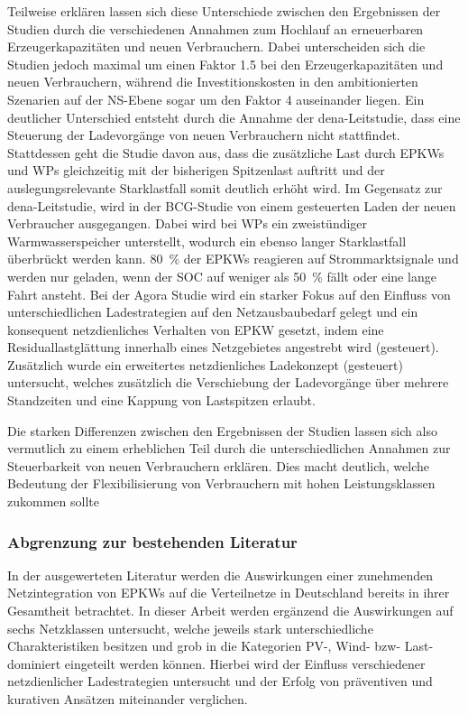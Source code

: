 Teilweise erklären lassen sich diese Unterschiede zwischen den Ergebnissen der Studien durch die verschiedenen Annahmen zum Hochlauf an erneuerbaren Erzeugerkapazitäten und neuen Verbrauchern.
Dabei unterscheiden sich die Studien jedoch maximal um einen Faktor \num{1.5} bei den Erzeugerkapazitäten und neuen Verbrauchern, während die Investitionskosten in den ambitionierten Szenarien auf der \gls{NS}-Ebene sogar um den Faktor \num{4} auseinander liegen.
Ein deutlicher Unterschied entsteht durch die Annahme der dena-Leitstudie, dass eine Steuerung der Ladevorgänge von neuen Verbrauchern nicht stattfindet.
Stattdessen geht die Studie davon aus, dass die zusätzliche Last durch \glspl{EPKW} und \glspl{WP} gleichzeitig mit der bisherigen Spitzenlast auftritt und der auslegungsrelevante Starklastfall somit deutlich erhöht wird.
Im Gegensatz zur dena-Leitstudie, wird in der BCG-Studie von einem gesteuerten Laden der neuen Verbraucher ausgegangen.
Dabei wird bei \glspl{WP} ein zweistündiger Warmwasserspeicher unterstellt, wodurch ein ebenso langer Starklastfall überbrückt werden kann.
\SI{80}{\percent} der \glspl{EPKW} reagieren auf Strommarktsignale und werden nur geladen, wenn der \gls{SOC} auf weniger als \SI{50}{\percent} fällt oder eine lange Fahrt ansteht.
Bei der Agora Studie wird ein starker Fokus auf den Einfluss von unterschiedlichen Ladestrategien auf den Netzausbaubedarf gelegt und ein konsequent netzdienliches Verhalten von \gls{EPKW} gesetzt, indem eine Residuallastglättung innerhalb eines Netzgebietes angestrebt wird (gesteuert).
Zusätzlich wurde ein erweitertes netzdienliches Ladekonzept (gesteuert\Plus) untersucht, welches zusätzlich die Verschiebung der Ladevorgänge über mehrere Standzeiten und eine Kappung von Lastspitzen erlaubt.\medskip

Die starken Differenzen zwischen den Ergebnissen der Studien lassen sich also vermutlich zu einem erheblichen Teil durch die unterschiedlichen Annahmen zur Steuerbarkeit von neuen Verbrauchern erklären.
Dies macht deutlich, welche Bedeutung der Flexibilisierung von Verbrauchern mit hohen Leistungsklassen zukommen sollte


\subsubsection{Abgrenzung zur bestehenden Literatur}

In der ausgewerteten Literatur werden die Auswirkungen einer zunehmenden Netzintegration von \glspl{EPKW} auf die Verteilnetze in Deutschland bereits in ihrer Gesamtheit betrachtet.
In dieser Arbeit werden ergänzend die Auswirkungen auf sechs Netzklassen untersucht, welche jeweils stark unterschiedliche Charakteristiken besitzen und grob in die Kategorien \gls{PV}-, Wind- bzw- Last-dominiert eingeteilt werden können.
Hierbei wird der Einfluss verschiedener netzdienlicher Ladestrategien untersucht und der Erfolg von präventiven und kurativen Ansätzen miteinander verglichen.\medskip

